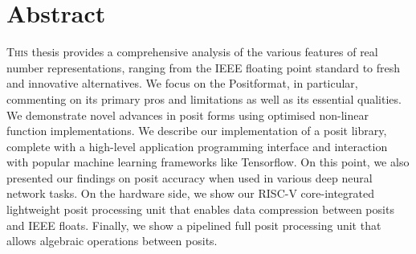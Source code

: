 \chapter*{Abstract}
\lettrine{T}{his} thesis provides a comprehensive analysis of the various features of real number representations, ranging from the IEEE floating point standard to fresh and innovative alternatives. We focus on the Posit\texttrademark format, in particular, commenting on its primary pros and limitations as well as its essential qualities. We demonstrate novel advances in posit forms using optimised non-linear function implementations. We describe our implementation of a posit library, complete with a high-level application programming interface and interaction with popular machine learning frameworks like Tensorflow. On this point, we also presented our findings on posit accuracy when used in various deep neural network tasks.
On the hardware side, we show our RISC-V core-integrated lightweight posit processing unit that enables data compression between posits and IEEE floats. Finally, we show a pipelined full posit processing unit that allows algebraic operations between posits.

